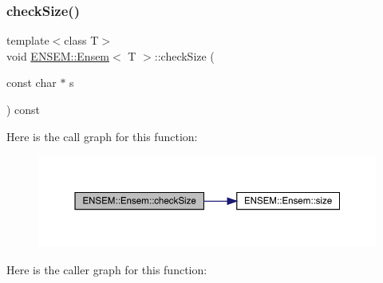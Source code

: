 \subsubsection{\texorpdfstring{checkSize()}{checkSize()}\hspace{0.1cm}{\footnotesize\ttfamily [2/6]}}
{\footnotesize\ttfamily template$<$class T$>$ \\
void \mbox{\hyperlink{classENSEM_1_1Ensem}{E\+N\+S\+E\+M\+::\+Ensem}}$<$ T $>$\+::check\+Size (\begin{DoxyParamCaption}\item[{const char $\ast$}]{s }\end{DoxyParamCaption}) const\hspace{0.3cm}{\ttfamily [inline]}}

Here is the call graph for this function\+:
\nopagebreak
\begin{figure}[H]
\begin{center}
\leavevmode
\includegraphics[width=350pt]{d7/d3e/classENSEM_1_1Ensem_a32978c0e251d9731bdb83c6069eb059d_cgraph}
\end{center}
\end{figure}
Here is the caller graph for this function\+:
\nopagebreak
